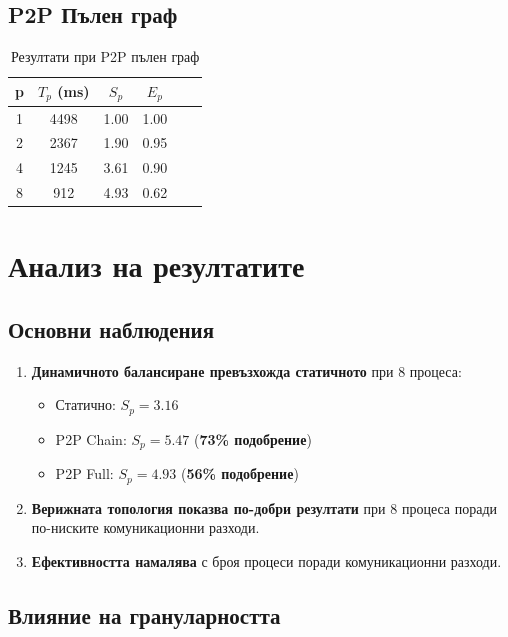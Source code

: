 \documentclass[12pt,a4paper]{article}
\begin{document}
\subsection{P2P Пълен граф}

\begin{table}[H]
\centering
\begin{tabular}{cccccc}
\toprule
\textbf{p} & \textbf{$T_p$ (ms)} & \textbf{$S_p$} & \textbf{$E_p$} \\
\midrule
1 & 4498 & 1.00 & 1.00 \\
2 & 2367 & 1.90 & 0.95 \\
4 & 1245 & 3.61 & 0.90 \\
8 & 912 & 4.93 & 0.62 \\
\bottomrule
\end{tabular}
\caption{Резултати при P2P пълен граф}
\end{table}

\section{Анализ на резултатите}

\subsection{Основни наблюдения}

\begin{enumerate}
    \item \textbf{Динамичното балансиране превъзхожда статичното} при 8 процеса:
    \begin{itemize}
        \item Статично: $S_p = 3.16$
        \item P2P Chain: $S_p = 5.47$ (\textbf{73\% подобрение})
        \item P2P Full: $S_p = 4.93$ (\textbf{56\% подобрение})
    \end{itemize}

    \item \textbf{Верижната топология показва по-добри резултати} при 8 процеса поради по-ниските комуникационни разходи.

    \item \textbf{Ефективността намалява} с броя процеси поради комуникационни разходи.
\end{enumerate}

\subsection{Влияние на грануларността}
\end{document}
